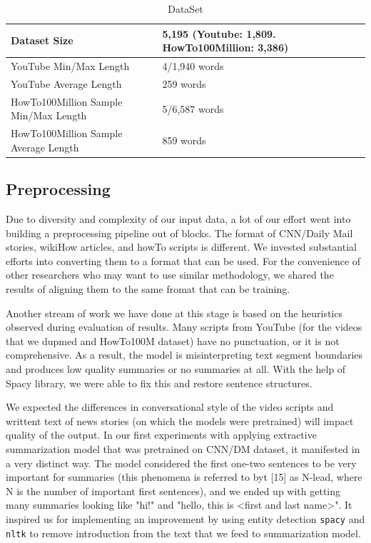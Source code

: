 \documentclass{article}
\begin{document}
\begin{table}[H]
  \caption{DataSet}
  \label{dataset}
  \centering
  \begin{tabular}{llll}
    \toprule
  Dataset Size  &  5,195 (Youtube: 1,809. HowTo100Million: 3,386)    \\
 \midrule   
   YouTube Min/Max Length  &  4/1,940 words     \\
\midrule
YouTube Average Length & 259 words    \\
\midrule
  HowTo100Million Sample Min/Max Length & 5/6,587 words    \\
\midrule
HowTo100Million Sample Average Length & 859 words   \\
\bottomrule
  \end{tabular}
\end{table}

\subsection{Preprocessing}
\label{Preprocessing}

Due to diversity and complexity of our input data, a lot of our effort went into building a preprocessing pipeline out of blocks. The format of CNN/Daily Mail stories, wikiHow articles, and howTo scripts is different. We invested substantial efforts into converting them to a format that can be used. For the convenience of other researchers who may want to use similar methodology, we shared the results of aligning them to the same fromat that can be training. 

Another stream of work we have done at this stage is based on the heuristics observed during evaluation of results. Many scripts from YouTube (for the videos that we dupmed and HowTo100M dataset) have no punctuation, or it is not comprehensive. As a result, the model is misinterpreting text segment boundaries and produces low quality summaries or no summaries at all. With the help of Spacy library, we were able to fix this and restore sentence structures. 

We expected the differences in conversational style of the video scripts and writtent text of news stories (on which the models were pretrained) will impact quality of the output. In our first experiments with applying extractive summarization model that was pretrained on CNN/DM dataset, it manifested in a very distinct way. The model considered the first one-two sentences to be very important for summaries (this phenomena is referred to byt [15] as N-lead, where N is the number of important first sentences), and we ended up with getting many summaries looking like "hi!" and "hello, this is <first and last name>". It inspired us for implementing an improvement by using entity detection   \verb+spacy+ and \verb+nltk+ to remove introduction from the text that we feed to summarization model.  
\end{document}
